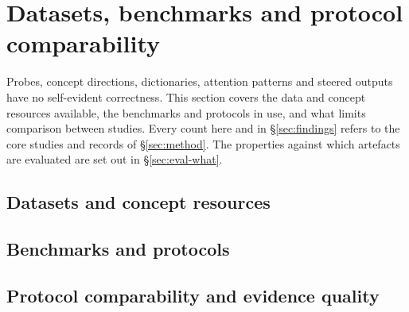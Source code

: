 \section{Datasets, benchmarks and protocol comparability}
\label{sec:evaluation}

Probes, concept directions, dictionaries, attention patterns and steered outputs have no self-evident
correctness. This section covers the data and concept resources available, the
benchmarks and protocols in use, and what limits comparison between studies. Every count here and in
\S\ref{sec:findings} refers to the \Ncore{} core studies and \Nclaims{} records of \S\ref{sec:method}.
The properties against which artefacts are evaluated are set out in \S\ref{sec:eval-what}.

\subsection{Datasets and concept resources}
\label{sec:eval-data}



\subsection{Benchmarks and protocols}
\label{sec:eval-bench}



\subsection{Protocol comparability and evidence quality}
\label{sec:eval-compare}



